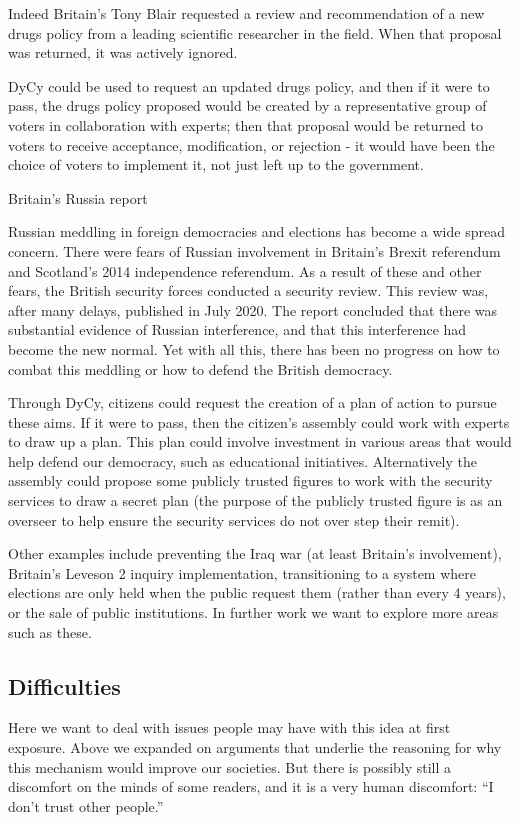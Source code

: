 \documentclass[twoside]{article}
\theoremstyle{definition}
\begin{document}
Indeed Britain's Tony Blair requested a review and recommendation of a new drugs policy from a leading scientific researcher in the field. When that proposal was returned, it was actively ignored.

DyCy could be used to request an updated drugs policy, and then if it were to pass, the drugs policy proposed would be created by a representative group of voters in collaboration with experts; then that proposal would be returned to voters to receive acceptance, modification, or rejection - it would have been the choice of voters to implement it, not just left up to the government.

Britain's Russia report

Russian meddling in foreign democracies and elections has become a wide spread concern. There were fears of Russian involvement in Britain's Brexit referendum and Scotland's 2014 independence referendum. As a result of these and other fears, the British security forces conducted a security review. This review was, after many delays, published in July 2020. The report concluded that there was substantial evidence of Russian interference, and that this interference had become the new normal. Yet with all this, there has been no progress on how to combat this meddling or how to defend the British democracy.

Through DyCy, citizens could request the creation of a plan of action to pursue these aims. If it were to pass, then the citizen's assembly could work with experts to draw up a plan. This plan could involve investment in various areas that would help defend our democracy, such as educational initiatives. Alternatively the assembly could propose some publicly trusted figures to work with the security services to draw a secret plan (the purpose of the publicly trusted figure is as an overseer to help ensure the security services do not over step their remit).

Other examples include preventing the Iraq war (at least Britain's involvement), Britain's Leveson 2 inquiry implementation, transitioning to a system where elections are only held when the public request them (rather than every 4 years), or the sale of public institutions. In further work we want to explore more areas such as these.

\subsection{Difficulties}

Here we want to deal with issues people may have with this idea at first exposure. Above we expanded on arguments that underlie the reasoning for why this mechanism would improve our societies. But there is possibly still a discomfort on the minds of some readers, and it is a very human discomfort: “I don’t trust other people.”
\end{document}
